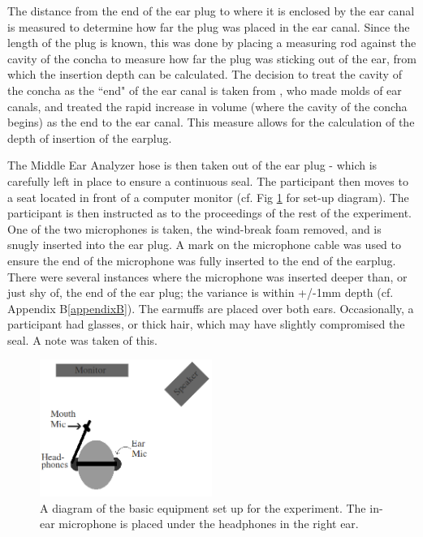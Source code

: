\documentclass[dissertation,copyright]{uathesis}
\begin{document}
The distance from the end of the ear plug to where it is enclosed by the ear canal is measured to determine how far the plug was placed in the ear canal. %
Since the length of the plug is known, this was done by placing a measuring rod against the cavity of the concha to measure how far the plug was sticking out of the ear, from which the insertion depth can be calculated. The decision to treat the cavity of the concha as the ``end" of the ear canal is taken from \cite{stenfelt:07}, who made molds of ear canals, and treated the rapid increase in volume (where the cavity of the concha begins) as the end to the ear canal.  This measure allows for the calculation of the depth of insertion of the earplug.

The Middle Ear Analyzer hose is then taken out of the ear plug - which is carefully left in place to ensure a continuous seal.  The participant then moves to a seat located in front of a computer monitor (cf. Fig \ref{fig:overallSetUp} for set-up diagram).  The participant is then instructed as to the proceedings of the rest of the experiment. One of the two microphones is taken, the wind-break foam removed, and is snugly inserted into the ear plug.  A mark on the microphone cable was used to ensure the end of the microphone was fully inserted to the end of the earplug.  There were several instances where the microphone was inserted deeper than, or just shy of, the end of the ear plug; the variance is within +/-1mm depth (cf. Appendix B\ref{appendixB}).  The earmuffs are placed over both ears.  Occasionally, a participant had glasses, or thick hair, which may have slightly compromised the seal.  A note was taken of this. 

\begin{figure}
\includegraphics[width=0.5\textwidth]{figure/overallSetUp.png}
\caption{A diagram of the basic equipment set up for the experiment.  The in-ear microphone is placed under the headphones in the right ear.}
\label{fig:overallSetUp}
\end{figure}
\end{document}
